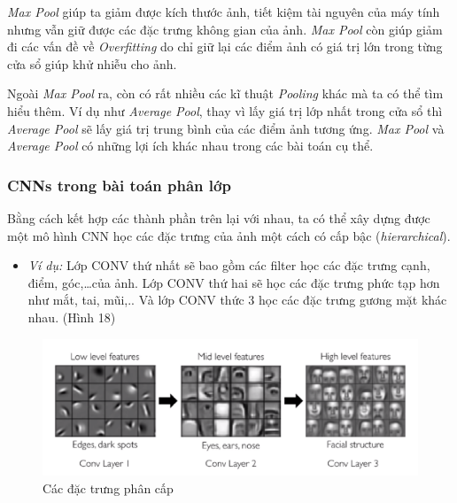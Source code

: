 \documentclass[a4paper, 12pt]{article}
\begin{document}
\textit{Max Pool} giúp ta giảm được kích thước ảnh, tiết kiệm tài nguyên của máy tính nhưng vẫn giữ được các đặc trưng không gian của ảnh. \textit{Max Pool} còn giúp giảm đi các vấn đề về \textit{Overfitting} do chỉ giữ lại các điểm ảnh có giá trị lớn trong từng cửa sổ giúp khử nhiễu cho ảnh. 

Ngoài \textit{Max Pool} ra, còn có rất nhiều các kĩ thuật \textit{Pooling} khác mà ta có thể tìm hiểu thêm. Ví dụ như \textit{Average Pool}, thay vì lấy giá trị lớp nhất trong cửa sổ thì \textit{Average Pool} sẽ lấy giá trị trung bình của các điểm ảnh tương ứng. \textit{Max Pool} và \textit{Average Pool} có những lợi ích khác nhau trong các bài toán cụ thể.

\subsubsection{CNNs trong bài toán phân lớp}
Bằng cách kết hợp các thành phần trên lại với nhau, ta có thể xây dựng được một mô hình CNN học các đặc trưng của ảnh một cách có cấp bậc (\textit{hierarchical}). 
\begin{itemize}
    \item \textit{Ví dụ:} Lớp CONV thứ nhất sẽ bao gồm các filter học các đặc trưng cạnh, điểm, góc,\dots của ảnh. Lớp CONV thứ hai sẽ học các đặc trưng phức tạp hơn như mắt, tai, mũi,.. Và lớp CONV thức 3 học các đặc trưng gương mặt khác nhau. (Hình 18)
\end{itemize}

\begin{figure}[H]
    \begin{center}
        \includegraphics[scale=0.3]{img/hierarchy}
        \caption{Các đặc trưng phân cấp}
    \end{center}
\end{figure}
\end{document}
